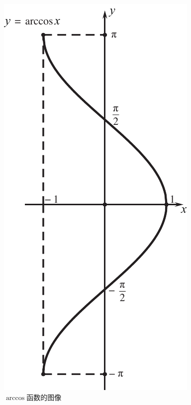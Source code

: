 \begin{figure}[!htb]
\begin{minipage}{0.49\linewidth}
		\includegraphics[width=0.51\linewidth]{pic/C-F/arccos.pdf}
		\caption{$\arccos$函数的图像}
		\label{acos}
	\end{minipage}
\end{figure}













